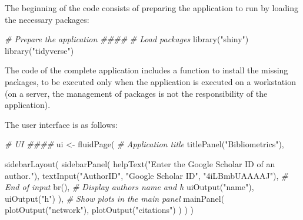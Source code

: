 \documentclass[
  12pt,
  american,
  a4paper,
  extrafontsizes,onecolumn,openright
  ]{memoir}
\newenvironment{Shaded}{\begin{snugshade}}{\end{snugshade}}
\newcommand{\CommentTok}[1]{\textcolor[rgb]{0.56,0.35,0.01}{\textit{#1}}}
\newcommand{\FunctionTok}[1]{\textcolor[rgb]{0.00,0.00,0.00}{#1}}
\newcommand{\NormalTok}[1]{#1}
\newcommand{\OtherTok}[1]{\textcolor[rgb]{0.56,0.35,0.01}{#1}}
\newcommand{\StringTok}[1]{\textcolor[rgb]{0.31,0.60,0.02}{#1}}
\newlength{\rf}
\begin{document}
The beginning of the code consists of preparing the application to run by loading the necessary packages:

\scriptsize

\begin{Shaded}
\begin{Highlighting}[]
\CommentTok{\# Prepare the application \#\#\#\#}
\CommentTok{\# Load packages}
\FunctionTok{library}\NormalTok{(}\StringTok{"shiny"}\NormalTok{)}
\FunctionTok{library}\NormalTok{(}\StringTok{"tidyverse"}\NormalTok{)}
\end{Highlighting}
\end{Shaded}

\normalsize

The code of the complete application includes a function to install the missing packages, to be executed only when the application is executed on a workstation (on a server, the management of packages is not the responsibility of the application).

The user interface is as follows:

\scriptsize

\begin{Shaded}
\begin{Highlighting}[]
\CommentTok{\# UI \#\#\#\#}
\NormalTok{ui }\OtherTok{\textless{}{-}} \FunctionTok{fluidPage}\NormalTok{(}
  \CommentTok{\# Application title}
  \FunctionTok{titlePanel}\NormalTok{(}\StringTok{"Bibliometrics"}\NormalTok{),}
  
  \FunctionTok{sidebarLayout}\NormalTok{(}
    \FunctionTok{sidebarPanel}\NormalTok{(}
      \FunctionTok{helpText}\NormalTok{(}\StringTok{"Enter the Google Scholar ID of an author."}\NormalTok{),}
      \FunctionTok{textInput}\NormalTok{(}\StringTok{"AuthorID"}\NormalTok{, }\StringTok{"Google Scholar ID"}\NormalTok{, }\StringTok{"4iLBmbUAAAAJ"}\NormalTok{),}
      \CommentTok{\# End of input}
      \FunctionTok{br}\NormalTok{(),}
      \CommentTok{\# Display author\textquotesingle{}s name and h}
      \FunctionTok{uiOutput}\NormalTok{(}\StringTok{"name"}\NormalTok{),}
      \FunctionTok{uiOutput}\NormalTok{(}\StringTok{"h"}\NormalTok{)}
\NormalTok{    ),}
    \CommentTok{\# Show plots in the main panel}
    \FunctionTok{mainPanel}\NormalTok{(}
      \FunctionTok{plotOutput}\NormalTok{(}\StringTok{"network"}\NormalTok{),}
      \FunctionTok{plotOutput}\NormalTok{(}\StringTok{"citations"}\NormalTok{)}
\NormalTok{    )}
\NormalTok{  )}
\NormalTok{)}
\end{Highlighting}
\end{Shaded}
\end{document}
